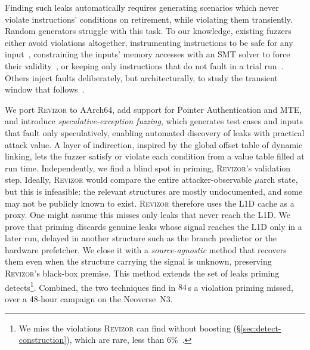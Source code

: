 \documentclass[letterpaper,twocolumn,10pt]{article}
\makeatletter
\theoremstyle{definition}
\def\uarch@bold#1#2\@nil{\if b#1\boldmath\fi}
\DeclareRobustCommand{\uarch}{{\expandafter\uarch@bold\f@series\@nil\ensuremath{\mu}}arch\xspace}
\makeatother
\begin{document}
Finding such leaks automatically requires generating scenarios which never violate instructions'
conditions on retirement, while violating them transiently. Random generators struggle with this
task. To our knowledge, existing fuzzers either avoid violations altogether, instrumenting
instructions to be safe for any input~\cite{revizor,hide_seek}, constraining the inputs' memory
accesses with an SMT solver to force their validity~\cite{scamv}, or keeping only instructions that
do not fault in a trial run~\cite{osiris}. Others inject faults deliberately, but architecturally,
to study the transient window that follows~\cite{speculation_fault,isolation,transynther}.

We port \textsc{Revizor} to AArch64, add support for Pointer Authentication and MTE, and introduce
\emph{speculative-exception fuzzing}, which generates test cases and inputs that fault only
speculatively, enabling automated discovery of leaks with practical attack value. A layer of
indirection, inspired by the global offset table of dynamic linking, lets the fuzzer satisfy or
violate each condition from a value table filled at run time. Independently, we find a blind spot in
priming, \textsc{Revizor}'s validation step. Ideally, \textsc{Revizor} would compare the entire
attacker-observable \uarch state, but this is infeasible: the relevant structures are mostly
undocumented, and some may not be publicly known to exist. \textsc{Revizor} therefore uses the
L1D cache as a proxy. One might assume this misses only leaks that never reach the L1D. We prove that
priming discards genuine leaks whose signal reaches the L1D only in a later run, delayed in
another structure such as the branch predictor or the hardware prefetcher. We close it with a
\emph{source-agnostic} method that recovers them even when the structure carrying the
signal is unknown, preserving \textsc{Revizor}'s black-box premise. This method extends the set of
leaks priming detects\footnote{We miss the violations \textsc{Revizor} can find without boosting
(\S\ref{sec:detect-construction}), which are rare, less than 6\%~\cite{hide_seek}.}.
Combined, the two techniques find in $84$\,s a violation priming missed, over a 48-hour campaign on
the Neoverse~N3.
\end{document}
